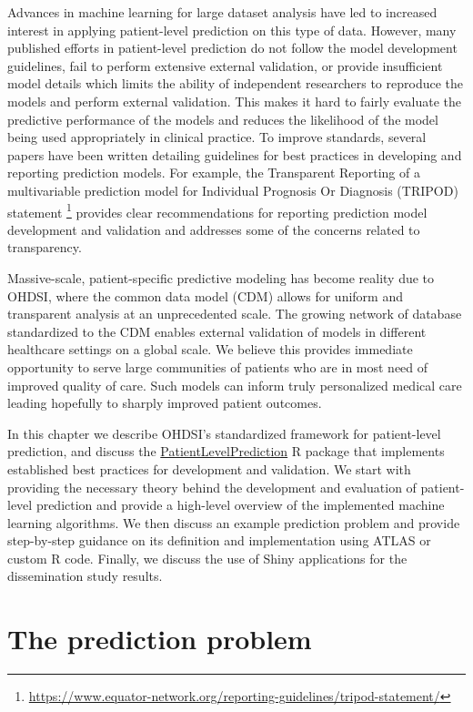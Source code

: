 \documentclass[11pt]{book}
\let\rmarkdownfootnote\footnote%
\def\footnote{\protect\rmarkdownfootnote}
\theoremstyle{definition}
\theoremstyle{definition}
\theoremstyle{definition}
\theoremstyle{remark}
\begin{document}
Advances in machine learning for large dataset analysis have led to increased interest in applying patient-level prediction on this type of data. However, many published efforts in patient-level prediction do not follow the model development guidelines, fail to perform extensive external validation, or provide insufficient model details which limits the ability of independent researchers to reproduce the models and perform external validation. This makes it hard to fairly evaluate the predictive performance of the models and reduces the likelihood of the model being used appropriately in clinical practice. To improve standards, several papers have been written detailing guidelines for best practices in developing and reporting prediction models. For example, the Transparent Reporting of a multivariable prediction model for Individual Prognosis Or Diagnosis (TRIPOD) statement \footnote{\url{https://www.equator-network.org/reporting-guidelines/tripod-statement/}} provides clear recommendations for reporting prediction model development and validation and addresses some of the concerns related to transparency.  

Massive-scale, patient-specific predictive modeling has become reality due to OHDSI, where the common data model (CDM) allows for uniform and transparent analysis at an unprecedented scale. The growing network of database standardized to the CDM enables external validation of models in different healthcare settings on a global scale. We believe this provides immediate opportunity to serve large communities of patients who are in most need of improved quality of care. Such models can inform truly personalized medical care leading hopefully to sharply improved patient outcomes.

In this chapter we describe OHDSI's standardized framework for patient-level prediction, \citep{reps2018} and discuss the \href{https://ohdsi.github.io/PatientLevelPrediction/}{PatientLevelPrediction} R package that implements established best practices for development and validation. We start with providing the necessary theory behind the development and evaluation of patient-level prediction and provide a high-level overview of the implemented machine learning algorithms. We then discuss an example prediction problem and provide step-by-step guidance on its definition and implementation using ATLAS or custom R code. Finally, we discuss the use of Shiny applications for the dissemination study results.

\hypertarget{the-prediction-problem}{%
\section{The prediction problem}\label{the-prediction-problem}}
\end{document}
